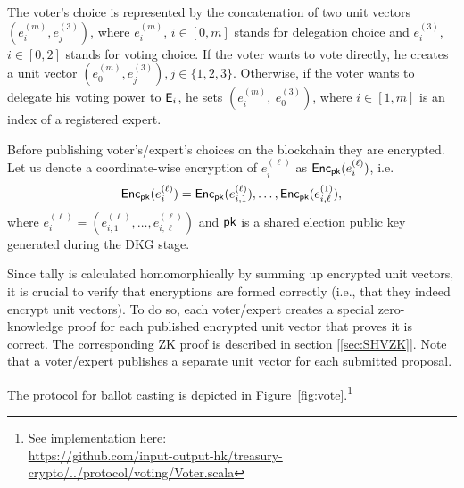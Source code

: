 The voter's choice is represented by the concatenation of two  unit vectors $( e^{(m)}_i , e^{(3)}_j )$, where $e^{(m)}_i$, $i\in[0,m]$ stands for delegation choice and $e^{(3)}_i$, $i\in[0,2]$ stands for voting choice. If the voter wants to vote directly, he creates a unit vector $( e^{(m)}_0 , e^{(3)}_j ), j \in \{1,2,3\}$. Otherwise, if the voter wants to delegate his voting power to $\mathsf{E}_i$, he sets $(e^{(m)}_i,\ e^{(3)}_0 )$, where $i \in [1,m]$ is an index of a registered expert. 

Before publishing voter's/expert's choices on the blockchain they are encrypted. Let us denote a coordinate-wise encryption of $e^{(\ell)}_i$ as $\mathsf{Enc}_{\mathsf{pk}}(e^{(\ell)}_i )$, i.e. 
\[\mathsf{Enc}_{\mathsf{pk}}(e^{(\ell)}_i ) = \mathsf{Enc}_{\mathsf{pk}}(e^{(\ell)}_{i,1}), \ldots, \mathsf{Enc}_{\mathsf{pk}}(e^{(1)}_{i,\ell}),\]
where $e^{(\ell)}_i = (e^{(\ell)}_{i,1},\ldots, e^{(\ell)}_{i,\ell})$ and $\mathsf{pk}$ is a shared election public key generated during the DKG stage.

Since tally is calculated homomorphically by summing up encrypted unit vectors, it is crucial to verify that encryptions are formed correctly (i.e., that they indeed encrypt unit vectors). To do so, each voter/expert creates a special zero-knowledge proof for each published encrypted unit vector that proves it is correct. The corresponding ZK proof is described in section [\ref{sec:SHVZK}].
Note that a voter/expert publishes a separate unit vector for each submitted proposal.

The protocol for ballot casting is depicted in Figure~\ref{fig:vote}.\footnote{See implementation here:\\ \href{https://github.com/input-output-hk/treasury-crypto/blob/master/src/main/scala/io/iohk/protocol/voting/Voter.scala}{https://github.com/input-output-hk/treasury-crypto/../protocol/voting/Voter.scala}}

